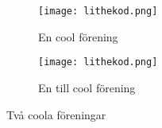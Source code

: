 \documentclass[preview]{standalone}
\begin{document}
\begin{figure}
    \centering
    \begin{subfigure}{.45\textwidth}
        \texttt{[image: lithekod.png]}
        \caption{En cool förening}
        \label{fig:subfig1}
    \end{subfigure}\quad%
    \begin{subfigure}{.45\textwidth}
        \texttt{[image: lithekod.png]}
        \caption{En till cool förening}
        \label{fig:subfig2}
    \end{subfigure}
    \caption{Två coola föreningar}
    \label{fig:mainfig}
\end{figure}
\vspace{1em}
\end{document}
